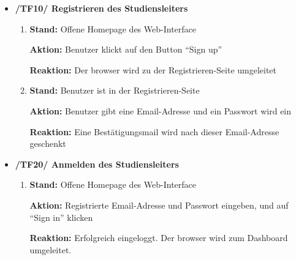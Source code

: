 \documentclass[a4paper]{scrreprt}
\begin{document}
            \begin{itemize}
                \item \textbf{/TF10/ Registrieren des \gls{Studiensleiter}s}
                    \begin{enumerate}
                        \item \par \textbf{Stand: }Offene Homepage des \gls{Web-Interface}
                            \par \textbf{Aktion: }Benutzer klickt auf den Button ``Sign up''
                            \par \textbf{Reaktion: }Der browser wird zu der Registrieren-Seite umgeleitet
                        \item \par \textbf{Stand: }Benutzer ist in der Registrieren-Seite
                             \par \textbf{Aktion: }Benutzer gibt eine Email-Adresse und ein Passwort wird ein
                             \par \textbf{Reaktion: }Eine Bestätigungsmail wird nach dieser Email-Adresse geschenkt
                   \end{enumerate}

                    \item \textbf{/TF20/ Anmelden des \gls{Studiensleiter}s}
                        \begin{enumerate}
                            \item \par \textbf{Stand: }Offene Homepage des \gls{Web-Interface}
                                \par \textbf{Aktion: }Registrierte Email-Adresse und Passwort eingeben, und auf “Sign in” klicken
                                \par \textbf{Reaktion: }Erfolgreich eingeloggt. Der browser wird zum Dashboard umgeleitet.
                        \end{enumerate}


\end{itemize}
\end{document}

